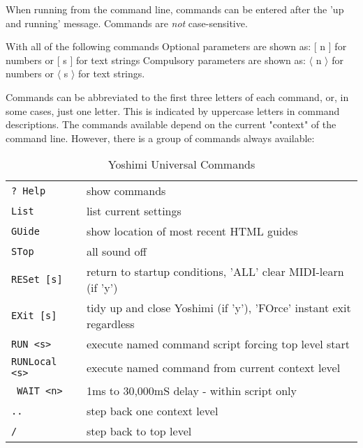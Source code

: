    When running from the command line, commands can be entered after the
   'up and running' message. Commands are \textsl{not} case-sensitive.

   \noindent With all of the following commands \newline
   Optional parameters are shown as: [ n ] for numbers or [ s ] for text
   strings \newline
   Compulsory parameters are shown as: \begin{math} \langle \end{math} n
   \begin{math} \rangle \end{math} for numbers or \begin{math} \langle
   \end{math} s \begin{math} \rangle \end{math} for text
   strings.

   \noindent Commands can be abbreviated to the first three letters of each
   command, or, in some cases, just one letter.  This is indicated by
   uppercase letters in command descriptions. The commands available depend
   on the current "context" of the command line. However, there is a group of
   commands always available:

\begin{center}
\begin{longtable}{p{3cm} p{12cm}}
\caption[Yoshimi Universial Commands]{Yoshimi Universal Commands} \\
\texttt{? Help} &
   show commands \\
\texttt{List} &
   list current settings \\
\texttt{GUide} &
   show location of most recent HTML guides \\
\texttt{STop} &
   all sound off \\
\texttt{RESet [s]} &
   return to startup conditions, 'ALL' clear MIDI-learn (if 'y') \\
\texttt{EXit [s]} &
   tidy up and close Yoshimi (if 'y'), 'FOrce' instant exit regardless \\
\texttt{RUN <s>} &
   execute named command script forcing top level start \\
\texttt{RUNLocal <s>} &
   execute named command from current context level \\
\texttt{  WAIT <n>} &
   1ms to 30,000mS delay - within script only \\
\texttt{..} &
   step back one context level \\
\texttt{/} &
   step back to top level \\
\end{longtable}
\end{center}

